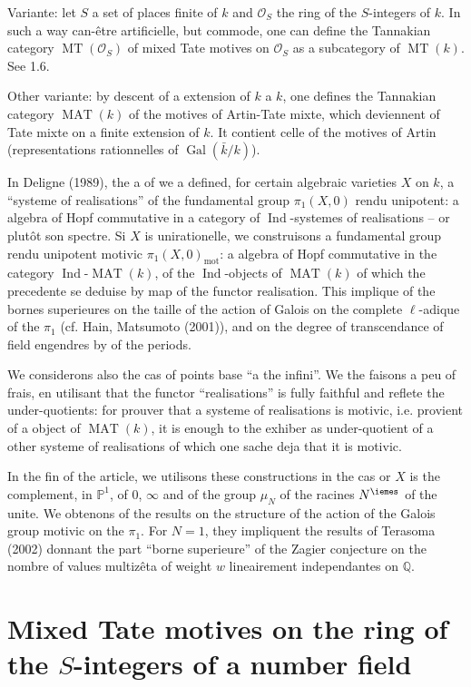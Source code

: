 \documentclass[11pt,a4paper]{article}
\theoremstyle{plain}
\theoremstyle{definition}
\theoremstyle{remark}
\DeclareMathOperator{\Gal}{Gal}
\DeclareMathOperator{\Ind}{Ind}
\DeclareMathOperator{\MAT}{MAT}
\DeclareMathOperator{\MT}{MT}
\DeclareMathOperator{\mot}{mot}
\newcommand{\dbP}{\mathbb{P}}
\newcommand{\dbQ}{\mathbb{Q}}
\newcommand{\scrO}{\mathscr{O}}
\newcommand{\kbar}{\bar{k}}
\providecommand{\Gal}{\operatorname{Gal}}
\providecommand{\mot}{\mathrm{mot}}
\begin{document}
Variante: let $S$ a set of places
finite of $k$ and $\scrO_S$ the ring of the
$S$-integers of $k$.
In such a way can-\^{e}tre artificielle, but
commode, one can define the Tannakian category $\MT(\scrO_S)$ of mixed Tate motives on $\scrO_S$ as a
subcategory of $\MT(k)$.
See 1.6.

Other variante: by descent of a extension
of $k$ a $k$, one defines the Tannakian category $\MAT(k)$ of the motives  of Artin-Tate 
mixte, which deviennent
of Tate mixte on a finite extension of $k$.
It contient celle of the motives of Artin
(representations rationnelles of
$\Gal(\kbar/k)$).

In Deligne (1989), the a of we a
defined, for certain algebraic varieties $X$ on $k$, a ``systeme of
realisations'' of the fundamental group
$\pi_1(X,0)$ rendu unipotent: a algebra of
Hopf commutative in a category of
$\Ind$-systemes of realisations -- or
plut\^{o}t son spectre.
Si $X$ is unirationelle, we construisons a
fundamental group rendu unipotent motivic
$\pi_1(X,0)_{\mot}$: a algebra of Hopf
commutative in the category 
$\Ind$-$\MAT(k)$, of the $\Ind$-objects of
$\MAT(k)$ of which the
precedente se deduise by map of the
functor realisation.
This implique of the bornes superieures on the
taille of the action of Galois on the
complete $\ell$-adique of the $\pi_1$ 
(cf. Hain, Matsumoto (2001)), and on the degree of 
transcendance of field engendres by of the
periods.

We considerons also the cas of points base
``a the infini''.
We the faisons a peu of frais, en utilisant
that the functor ``realisations'' is
fully faithful and reflete the
under-quotients: for prouver that a systeme
of realisations is motivic, i.e. provient
of a object of $\MAT(k)$, it is enough to
the exhiber as under-quotient of a other
systeme of realisations of which one sache
deja that it is motivic. 

In the fin of the article, we utilisons these
constructions in the cas or $X$ is the
complement, in $\dbP^1$, of $0$, $\infty$ and
of the group $\mu_N$ of the racines $N^{\iemes}$ of
the unite.
We obtenons of the results on the
structure of the action 
of the Galois group motivic on the $\pi_1$.
For $N=1$, they impliquent the results of
Terasoma (2002) donnant the part ``borne
superieure'' of the Zagier conjecture on
the nombre of values multiz\^{e}ta of weight
$w$ lineairement independantes on
$\dbQ$.


\section{Mixed Tate motives on the ring of the $S$-integers of a number field}
\end{document}
